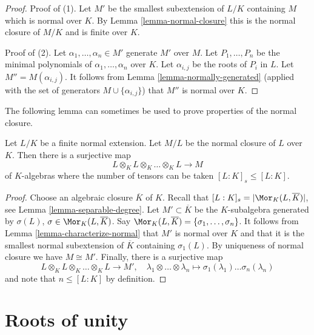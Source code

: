 \begin{proof}
Proof of (1). Let $M'$ be the smallest subextension of $L/K$ containing $M$
which is normal over $K$. By Lemma \ref{lemma-normal-closure}
this is the normal closure of $M/K$ and is finite over $K$.

\medskip\noindent
Proof of (2). Let $\alpha_1, \ldots, \alpha_n \in M'$ generate $M'$ over $M$.
Let $P_1, \ldots, P_n$ be the minimal polynomials of
$\alpha_1, \ldots, \alpha_n$ over $K$. Let $\alpha_{i, j}$ be the roots
of $P_i$ in $L$. Let $M''  = M(\alpha_{i, j})$. It follows from
Lemma \ref{lemma-normally-generated}
(applied with the set of generators $M \cup \{\alpha_{i, j}\}$)
that $M''$ is normal over $K$.
\end{proof}

\noindent
The following lemma can sometimes be used to prove properties
of the normal closure.

\begin{lemma}
\label{lemma-normal-closure-tensor-product}
Let $L/K$ be a finite normal extension. Let $M/L$ be the normal
closure of $L$ over $K$. Then there is a surjective map
$$
L \otimes_K L \otimes_K \ldots \otimes_K L \longrightarrow M
$$
of $K$-algebras where the number of tensors can be taken
$[L : K]_s \leq [L : K]$.
\end{lemma}

\begin{proof}
Choose an algebraic closure $\overline{K}$ of $K$.
Recall that $[L : K]_s = |\Mor_K(L, \overline{K})|$, see
Lemma \ref{lemma-separable-degree}.
Let $M' \subset \overline{K}$ be the $K$-subalgebra
generated by $\sigma(L)$, $\sigma \in \Mor_K(L, \overline{K})$.
Say $\Mor_K(L, \overline{K}) = \{\sigma_1, \ldots, \sigma_n\}$.
It follows from Lemma \ref{lemma-characterize-normal}
that $M'$ is normal over $K$ and that it is the
smallest normal subextension of $\overline{K}$ containing
$\sigma_1(L)$. By uniqueness of normal closure we
have $M \cong M'$. Finally, there is a surjective map
$$
L \otimes_K L \otimes_K \ldots \otimes_K L \longrightarrow M',
\quad
\lambda_1 \otimes \ldots \otimes \lambda_n \longmapsto
\sigma_1(\lambda_1) \ldots \sigma_n(\lambda_n)
$$
and note that $n \leq [L : K]$ by definition.
\end{proof}












\section{Roots of unity}
\label{section-roots-of-1}

